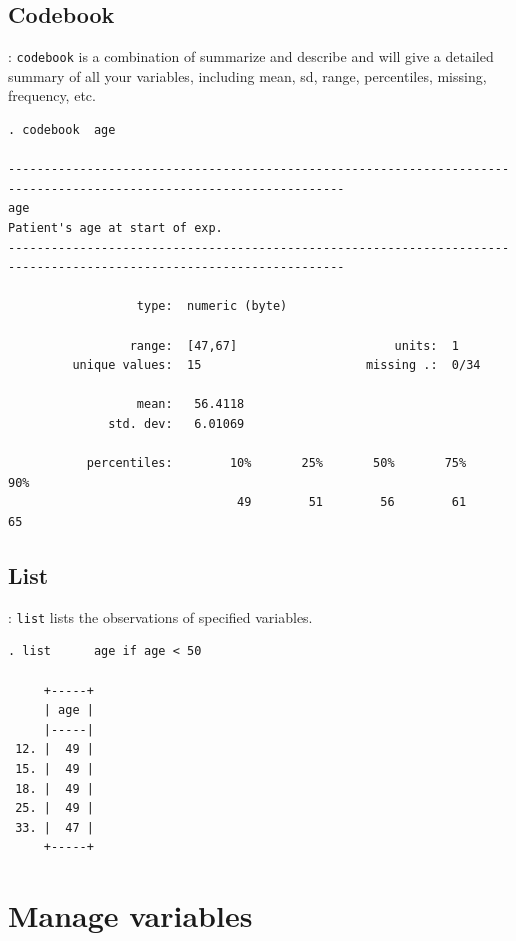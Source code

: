 \subsection{Codebook}
\begin{frame}[fragile]{\secname : \subsecname}
\verb|codebook| is a combination of summarize and describe and will give a detailed summary of all your variables, including mean, sd, range, percentiles, missing, frequency, etc. \\[4mm]
\tiny
\begin{verbatim}
. codebook  age

---------------------------------------------------------------------------------------------------------------------
age                                                                      Patient's age at start of exp.
---------------------------------------------------------------------------------------------------------------------

                  type:  numeric (byte)

                 range:  [47,67]                      units:  1
         unique values:  15                       missing .:  0/34

                  mean:   56.4118
              std. dev:   6.01069

           percentiles:        10%       25%       50%       75%       90%
                                49        51        56        61        65

\end{verbatim}
\end{frame}

\subsection{List}
\begin{frame}[fragile]{\secname : \subsecname}
\verb|list| lists the observations of specified variables. \\[4mm]
\small
\begin{verbatim}
. list      age if age < 50

     +-----+
     | age |
     |-----|
 12. |  49 |
 15. |  49 |
 18. |  49 |
 25. |  49 |
 33. |  47 |
     +-----+

\end{verbatim}
\end{frame}


\section{Manage variables}
